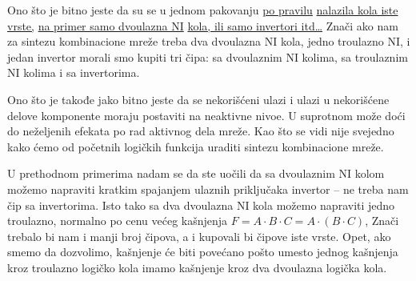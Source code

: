 \begin{frame}[label=03-s004]
\gusttekst
Ono što je bitno jeste da su se u jednom pakovanju \underline{po pravilu} \underline{nalazila kola iste vrste,} \underline{na primer samo dvoulazna NI} \underline{kola, ili samo invertori itd\ldots} Znači ako nam za sintezu kombinacione mreže treba dva dvoulazna NI kola, jedno troulazno NI, i jedan invertor morali smo kupiti tri čipa: sa dvoulaznim NI kolima, sa troulaznim NI kolima i sa invertorima.

\alert{Ono što je takođe jako bitno jeste da se nekorišćeni ulazi i ulazi u nekorišćene delove komponente moraju postaviti na neaktivne nivoe. U suprotnom može doći do neželjenih efekata po rad aktivnog dela mreže. Kao što se vidi nije svejedno kako ćemo od početnih logičkih funkcija uraditi sintezu kombinacione mreže.}

U prethodnom primerima nadam se da ste uočili da sa dvoulaznim NI kolom možemo napraviti kratkim spajanjem ulaznih priključaka invertor – ne treba nam čip sa invertorima. Isto tako sa dva dvoulazna NI kola možemo napraviti jedno troulazno, normalno po cenu većeg kašnjenja \(F=A\cdot B\cdot C=A\cdot(B\cdot C)\), Znači trebalo bi nam i manji broj čipova, a i kupovali bi čipove iste vrste. Opet, ako smemo da dozvolimo, kašnjenje će biti povećano pošto umesto jednog kašnjenja kroz troulazno logičko kola imamo kašnjenje kroz dva dvoulazna logička kola.
\end{frame}
